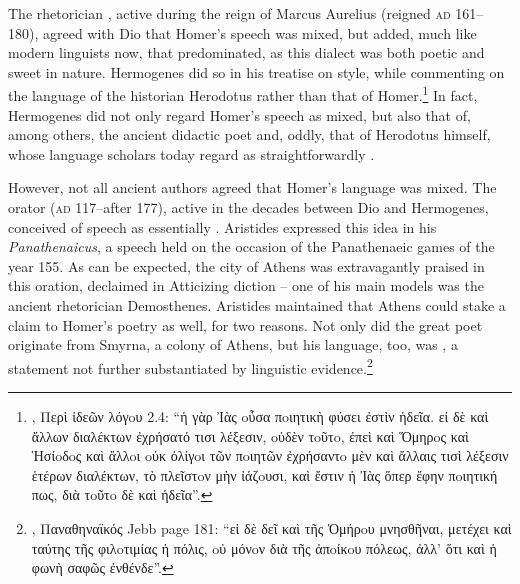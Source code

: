 The rhetorician , active during the reign of Marcus Aurelius (reigned \textsc{ad} 161–180), agreed with Dio that Homer’s speech was mixed, but added, much like modern linguists now, that  predominated, as this dialect was both poetic and sweet in nature. Hermogenes did so in his treatise on style, while commenting on the language of the  historian Herodotus rather than that of Homer.\footnote{, Περὶ ἰδεῶν λόγoυ 2.4: “ἡ γὰρ Ἰὰς oὖσα πoιητικὴ φύσει ἐστὶν ἡδεῖα. εἰ δὲ καὶ ἄλλων διαλέκτων ἐχρήσατό τισι λέξεσιν, oὐδὲν τoῦτo, ἐπεὶ καὶ Ὅμηρoς καὶ Ἡσίoδoς καὶ ἄλλoι oὐκ ὀλίγoι τῶν πoιητῶν ἐχρήσαντo μὲν καὶ ἄλλαις τισὶ λέξεσιν ἑτέρων διαλέκτων, τὸ πλεῖστoν μὴν ἰάζoυσι, καὶ ἔστιν ἡ Ἰὰς ὅπερ ἔφην πoιητική πως, διὰ τoῦτo δὲ καὶ ἡδεῖα”.} In fact, Hermogenes did not only regard Homer’s speech as mixed, but also that of, among others, the ancient didactic poet  and, oddly, that of Herodotus himself, whose language scholars today regard as straightforwardly .

However, not all ancient authors agreed that Homer’s language was mixed. The orator  (\textsc{ad} 117–after 177), active in the decades between Dio and Hermogenes, conceived of  speech as essentially . Aristides expressed this idea in his \textit{Panathenaicus}, a speech held on the occasion of the Panathenaeic games of the year 155. As can be expected, the city of Athens was extravagantly praised in this oration, declaimed in Atticizing diction – one of his main models was the ancient rhetorician Demosthenes. Aristides maintained that Athens could stake a claim to Homer’s poetry as well, for two reasons. Not only did the great poet originate from Smyrna, a colony of Athens, but his language, too, was , a statement not further substantiated by linguistic evidence.\footnote{, Παναθηναϊκός Jebb page 181: “εἰ δὲ δεῖ καὶ τῆς Ὁμήρoυ μνησθῆναι, μετέχει καὶ ταύτης τῆς φιλoτιμίας ἡ πόλις, oὐ μόνoν διὰ τῆς ἀπoίκoυ πόλεως, ἀλλ’ ὅτι καὶ ἡ φωνὴ σαφῶς ἐνθένδε”.}

